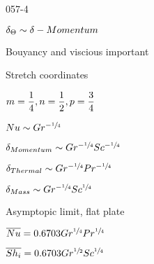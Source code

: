 \begin{mitframe}{057-4}
\begin{listone}
		\item $\blthick_{\dimltemp}\sim\blthick-{Momentum}$
        \item Bouyancy and viscious important
        \item Stretch coordinates
        		\begin{listtwo}
                	\item $\mass=\dfrac{1}{4}, n=\dfrac{1}{2}, p=\dfrac{3}{4}$
                 \end{listtwo}
\item $\nusselt\sim\grashof^{-\sfrac{1}{4}}$
\item $\blthick_{Momentum}\sim\grashof^{-\sfrac{1}{4}}\schmidt^{-\sfrac{1}{4}}$
\item $\blthick_{Thermal}\sim\grashof^{-\sfrac{1}{4}}\prandtl^{-\sfrac{1}{4}}$
\item $\blthick_{Mass}\sim\grashof^{-\sfrac{1}{4}}\schmidt^{\sfrac{1}{4}}$


\item Asymptopic limit, flat plate
\item $\overline{\nusselt}=0.6703\grashof^{\sfrac{1}{4}}\prandtl^{\sfrac{1}{4}}$
\item $\overline{\sherwood_{\state}}=0.6703\grashof^{\sfrac{1}{2}}\schmidt^{\sfrac{1}{4}}$
\end{listone}        
\end{mitframe}